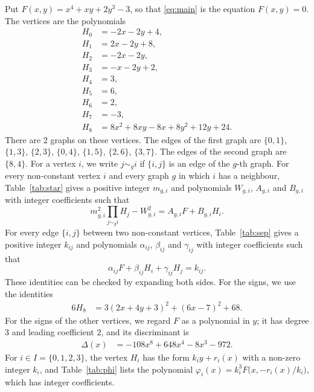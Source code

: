 \documentclass[11pt]{article}
\begin{document}
Put $F(x,y)=x^{4}+xy+2y^{3}-3$, so that \eqref{eq:main} is the equation $F(x,y)=0$. The vertices are the polynomials
\begin{align*}
H_{0}&=-2x-2y+4,\\
H_{1}&=2x-2y+8,\\
H_{2}&=-2x-2y,\\
H_{3}&=-x-2y+2,\\
H_{4}&=3,\\
H_{5}&=6,\\
H_{6}&=2,\\
H_{7}&=-3,\\
H_{8}&=8x^{2}+8xy-8x+8y^{2}+12y+24.
\end{align*}
There are 2 graphs on these vertices. The edges of the first graph are $\{0,1\}$, $\{1,3\}$, $\{2,3\}$, $\{0,4\}$, $\{1,5\}$, $\{2,6\}$, $\{3,7\}$. The edges of the second graph are $\{8,4\}$. For a vertex $i$, we write $j\sim_g i$ if $\{i,j\}$ is an edge of the $g$-th graph.
For every non-constant vertex $i$ and every graph $g$ in which $i$ has a neighbour, Table~\ref{tab:star} gives a positive integer $m_{g,i}$ and polynomials $W_{g,i}$, $A_{g,i}$ and $B_{g,i}$ with integer coefficients such that
\begin{equation}\label{eq:star}
m_{g,i}^2\prod_{j\sim_g i}H_j-W_{g,i}^2=A_{g,i}F+B_{g,i}H_i.
\end{equation}
For every edge $\{i,j\}$ between two non-constant vertices, Table~\ref{tab:sep} gives a positive integer $k_{ij}$ and polynomials $\alpha_{ij}$, $\beta_{ij}$ and $\gamma_{ij}$ with integer coefficients such that
\begin{equation}\label{eq:sep}
\alpha_{ij}F+\beta_{ij}H_i+\gamma_{ij}H_j=k_{ij}.
\end{equation}
These identities can be checked by expanding both sides.
For the signs, we use
the identities
\begin{align}
6H_{8}&=3(2x+4y+3)^2+(6x-7)^2+68.\label{eq:sign8}
\end{align}
For the signs of the other vertices, we regard $F$ as a polynomial in $y$; it has degree $3$ and leading coefficient $2$, and its discriminant is
\begin{align*}
\Delta(x)&=-108x^{8}+648x^{4}-8x^{3}-972.
\end{align*}
For $i\in I=\{0,\allowbreak 1,\allowbreak 2,\allowbreak 3\}$, the vertex $H_i$ has the form $k_iy+r_i(x)$ with a non-zero integer $k_i$, and Table~\ref{tab:phi} lists the polynomial $\varphi_i(x)=k_i^3F\bigl(x,-r_i(x)/k_i\bigr)$, which has integer coefficients.
\end{document}
